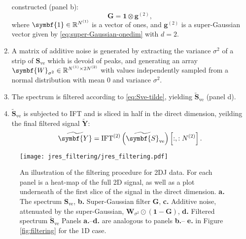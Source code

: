 \begin{enumerate}
        constructed (panel b):
        \begin{equation}
            \symbf{G} = \symbf{1} \otimes \symbf{g}^{(2)},
        \end{equation}
        where $\symbf{1} \in \mathbb{R}^{\None}$ is a vector of ones, and
        $\symbf{g}^{(2)}$ is a super-Gaussian vector given by
        \eqref{eq:super-Gaussian-onedim} with $d=2$.
    \item A matrix of additive noise is generated by extracting the variance
        $\sigma^2$ of a strip of $\symbf{S}_{\text{ve}}$ which is devoid of
        peaks, and generating an array $\symbf{W}_{\sigma^2} \in
        \mathbb{R}^{\None \times 2 \Ntwo}$ with values independently sampled
        from a normal distribution with mean $0$ and variance  $\sigma^2$.
    \item The spectrum is filtered according to \eqref{eq:Sve-tilde}, yielding
        $\widetilde{\symbf{S}}_{\text{ve}}$ (panel d).
    \item $\widetilde{\symbf{S}}_{\text{ve}}$ is subjected to \ac{IFT} and is
        sliced in half in the direct dimension, yeilding the final filtered
        signal $\widetilde{\symbf{Y}}$:
        \begin{equation}
            \widetilde{\symbf{Y}} = \IFT^{(2)}\left(\widetilde{\symbf{S}}_{\text{ve}}\right) \left[:, : \Ntwo\right].
        \end{equation}
\end{enumerate}

\begin{figure}
    \centering
    \texttt{[image: jres\_filtering/jres\_filtering.pdf]}
    \caption[
        An illustration of the filtering procedure for \ac{2DJ} data.
    ]
    {
        An illustration of the filtering procedure for \ac{2DJ} data.
        For each panel is a heat-map of the full \ac{2D} signal, as well as a
        plot underneath of the first slice of the signal in the direct
        dimension.
        \textbf{a.} The spectrum $\symbf{S}_{\text{ve}}$,
        \textbf{b.} Super-Gaussian filter $\symbf{G}$,
        \textbf{c.} Additive noise, attenuated by the super-Gaussian, $\symbf{W}_{\sigma^2} \odot (\symbf{1} - \symbf{G})$,
        \textbf{d.} Filtered spectrum $\widetilde{\symbf{S}}_{\text{ve}}$
        Panels \textbf{a.}--\textbf{d.} are analogous to panels \textbf{b.}--
        \textbf{e.} in Figure \ref{fig:filtering} for the \ac{1D} case.
    }
    \label{fig:jres-filtering}
\end{figure}

